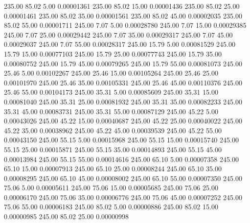     235.00     85.02      5.00     0.00001361
    235.00     85.02     15.00     0.00001436
    235.00     85.02     25.00     0.00001461
    235.00     85.02     35.00     0.00001561
    235.00     85.02     45.00     0.00002035
    235.00     85.02     55.00     0.00001711
    245.00      7.07      5.00     0.00028780
    245.00      7.07     15.00     0.00029385
    245.00      7.07     25.00     0.00029442
    245.00      7.07     35.00     0.00029317
    245.00      7.07     45.00     0.00029037
    245.00      7.07     55.00     0.00028317
    245.00     15.79      5.00     0.00081529
    245.00     15.79     15.00     0.00077103
    245.00     15.79     25.00     0.00077743
    245.00     15.79     35.00     0.00080752
    245.00     15.79     45.00     0.00079265
    245.00     15.79     55.00     0.00081073
    245.00     25.46      5.00     0.00102267
    245.00     25.46     15.00     0.00105264
    245.00     25.46     25.00     0.00101970
    245.00     25.46     35.00     0.00105331
    245.00     25.46     45.00     0.00110376
    245.00     25.46     55.00     0.00104173
    245.00     35.31      5.00     0.00085609
    245.00     35.31     15.00     0.00081040
    245.00     35.31     25.00     0.00081932
    245.00     35.31     35.00     0.00082233
    245.00     35.31     45.00     0.00083731
    245.00     35.31     55.00     0.00087129
    245.00     45.22      5.00     0.00043026
    245.00     45.22     15.00     0.00040687
    245.00     45.22     25.00     0.00040022
    245.00     45.22     35.00     0.00038962
    245.00     45.22     45.00     0.00039539
    245.00     45.22     55.00     0.00043150
    245.00     55.15      5.00     0.00015968
    245.00     55.15     15.00     0.00015740
    245.00     55.15     25.00     0.00015871
    245.00     55.15     35.00     0.00014893
    245.00     55.15     45.00     0.00013984
    245.00     55.15     55.00     0.00014616
    245.00     65.10      5.00     0.00007358
    245.00     65.10     15.00     0.00007913
    245.00     65.10     25.00     0.00008244
    245.00     65.10     35.00     0.00008295
    245.00     65.10     45.00     0.00008002
    245.00     65.10     55.00     0.00007350
    245.00     75.06      5.00     0.00005611
    245.00     75.06     15.00     0.00005685
    245.00     75.06     25.00     0.00006170
    245.00     75.06     35.00     0.00006776
    245.00     75.06     45.00     0.00007252
    245.00     75.06     55.00     0.00006183
    245.00     85.02      5.00     0.00000886
    245.00     85.02     15.00     0.00000985
    245.00     85.02     25.00     0.00000998

